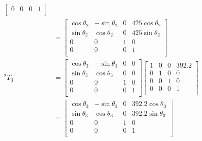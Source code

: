 \documentclass[UTF8, 13pt]{ctexart}
\begin{document}
\[\begin{aligned}
\begin{bmatrix}
        0 & 0 & 0 & 1 \\
        \end{bmatrix} \\
        &= \begin{bmatrix}
        \cos\theta_2 & -\sin\theta_2 & 0 & 425\cos\theta_2 \\
        \sin\theta_2 & \cos\theta_2 & 0 & 425\sin\theta_2 \\
        0 & 0 & 1 & 0 \\
        0 & 0 & 0 & 1 \\
        \end{bmatrix} \\[1em]
{}^2T_3 &= \begin{bmatrix}
        \cos\theta_3 & -\sin\theta_3 & 0 & 0 \\
        \sin\theta_3 & \cos\theta_3 & 0 & 0 \\
        0 & 0 & 1 & 0 \\
        0 & 0 & 0 & 1 \\
        \end{bmatrix}
        \begin{bmatrix}
        1 & 0 & 0 & 392.2 \\
        0 & 1 & 0 & 0 \\
        0 & 0 & 1 & 0 \\
        0 & 0 & 0 & 1 \\
        \end{bmatrix} \\
        &= \begin{bmatrix}
        \cos\theta_3 & -\sin\theta_3 & 0 & 392.2\cos\theta_3 \\
        \sin\theta_3 & \cos\theta_3 & 0 & 392.2\sin\theta_3 \\
        0 & 0 & 1 & 0 \\
        0 & 0 & 0 & 1 \\
        \end{bmatrix} \\
\end{aligned}
\]
\end{document}
